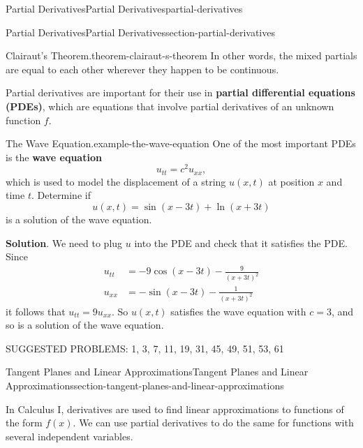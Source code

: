 \documentclass[oneside,10pt,]{book}
\newcommand{\terminology}[1]{\textbf{#1}}
\numberwithin{equation}{section}
\begin{document}
\begin{chapterptx}{Partial Derivatives}{}{Partial Derivatives}{}{}{partial-derivatives}
\begin{sectionptx}{Partial Derivatives}{}{Partial Derivatives}{}{}{section-partial-derivatives}
\begin{theorem}{Clairaut's Theorem.}{}{theorem-clairaut-s-theorem}
In other words, the mixed partials are equal to each other wherever they happen to be continuous.%
\end{theorem}
\hypertarget{p-1368}{}%
Partial derivatives are important for their use in \terminology{partial differential equations (PDEs)}, which are equations that involve partial derivatives of an unknown function \(f\).%
\begin{example}{The Wave Equation.}{example-the-wave-equation}%
\hypertarget{p-1369}{}%
One of the most important PDEs is the \terminology{wave equation}%
\begin{equation*}
u_{tt} = c^{2}u_{xx},
\end{equation*}
which is used to model the displacement of a string \(u(x,t)\) at position \(x\) and time \(t\). Determine if%
\begin{equation*}
u(x,t) = \sin(x-3t) + \ln(x+3t)
\end{equation*}
is a solution of the wave equation.%
\par\smallskip%
\noindent\textbf{Solution}.\hypertarget{solution-220}{}\quad%
\hypertarget{p-1370}{}%
We need to plug \(u\) into the PDE and check that it satisfies the PDE. Since%
\begin{align*}
u_{tt} & = -9\cos(x-3t) - \frac{9}{(x+3t)^{2}} \\
u_{xx} & = -\sin(x-3t) - \frac{1}{(x+3t)^{2}} 
\end{align*}
it follows that \(u_{tt} = 9u_{xx}\). So \(u(x,t)\) satisfies the wave equation with \(c=3\), and so is a solution of the wave equation.%
\end{example}
\hypertarget{p-1371}{}%
SUGGESTED PROBLEMS: 1, 3, 7, 11, 19, 31, 45, 49, 51, 53, 61%
\end{sectionptx}
%
%
\typeout{************************************************}
\typeout{************************************************}
%
\begin{sectionptx}{Tangent Planes and Linear Approximations}{}{Tangent Planes and Linear Approximations}{}{}{section-tangent-planes-and-linear-approximations}
\begin{introduction}{}%
\hypertarget{p-1372}{}%
In Calculus I, derivatives are used to find linear approximations to functions of the form \(f(x)\). We can use partial derivatives to do the same for functions with several independent variables.%
\end{introduction}%
%
%
\typeout{************************************************}

\end{sectionptx}
\end{chapterptx}
\end{document}
